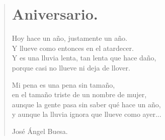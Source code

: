 \documentclass[11pt, portrait, twoside, notitlepage, openright]{book}
\begin{document}
\newpage
\begin{verse}
\begin{center}
\section{Aniversario.}
\end{center}
Hoy hace un año, justamente un año.\\
Y llueve como entonces en el atardecer.\\
Y es una lluvia lenta, tan lenta que hace daño,\\
porque casi no llueve ni deja de llover.
\newline

Mi pena es una pena sin tamaño,\\
en el tamaño triste de un nombre de mujer,\\
aunque la gente pasa sin saber qué hace un año,\\
y aunque la lluvia ignora que llueve como ayer...
\newline

José Ángel Buesa.
\end{verse}
\end{document}
